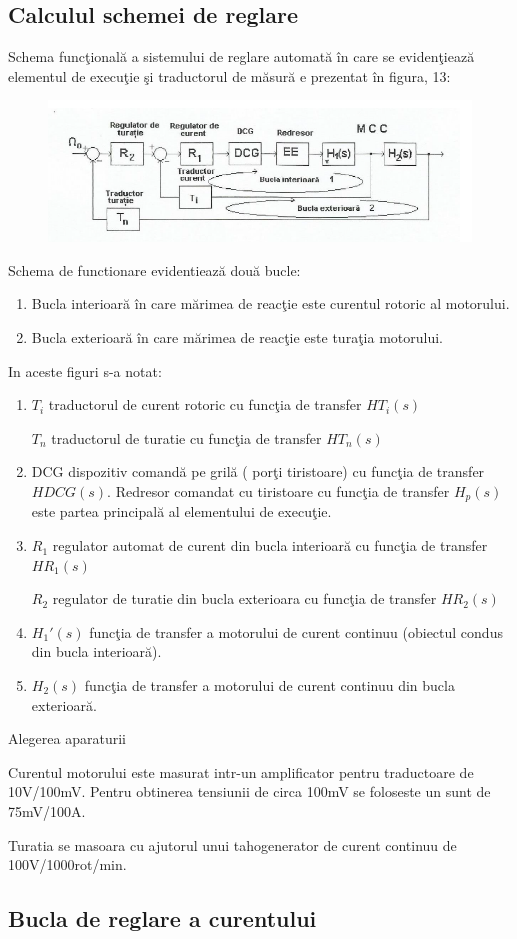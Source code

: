 \documentclass[11pt]{article}
\begin{document}
\subsection{Calculul schemei de reglare}
Schema funcţională a sistemului de reglare automată în care se evidenţiează elementul de execuţie şi traductorul de măsură e prezentat în figura, 13:
\begin{figure}[H]
	\centering
	\includegraphics[width=.9\linewidth]{fig14.png}
	\label{fig:test2}
\end{figure}
Schema de functionare evidentiează două bucle:
\begin{enumerate}
	\item Bucla interioară în care mărimea de reacţie este curentul rotoric al motorului.
	\item Bucla exterioară în care mărimea de reacţie este turaţia motorului.
\end{enumerate}
In aceste figuri s-a notat:
\begin{enumerate}[label=$\bullet$]
	\item $T_i$ traductorul de curent rotoric cu funcţia de transfer $HT_i(s)$
	
	 $T_n$ traductorul de turatie cu funcţia de transfer $HT_n(s)$
	\item DCG dispozitiv comandă pe grilă ( porţi tiristoare) cu funcţia de transfer $H DCG (s)$. Redresor comandat cu tiristoare cu funcţia de transfer $H_p(s)$ este partea principală al elementului de execuţie.
	\item $R_1$ regulator automat de curent din bucla interioară cu funcţia de transfer $HR_1(s)$
	
	 $R_2$ regulator de turatie din bucla exterioara cu funcţia de transfer $HR_2(s)$
	\item $H_1' (s)$ funcţia de transfer a motorului de curent continuu (obiectul condus din bucla interioară).
	\item $H_2 (s)$ funcţia de transfer a motorului de curent continuu din bucla exterioară.
\end{enumerate}
Alegerea aparaturii

Curentul motorului este masurat intr-un amplificator pentru traductoare de 10V/100mV. Pentru obtinerea tensiunii de circa 100mV se foloseste un sunt de 75mV/100A.

Turatia se masoara cu ajutorul unui tahogenerator de curent continuu de 100V/1000rot/min.

\subsection{Bucla de reglare a curentului}


\newpage
\nocite{*}


\end{document}
